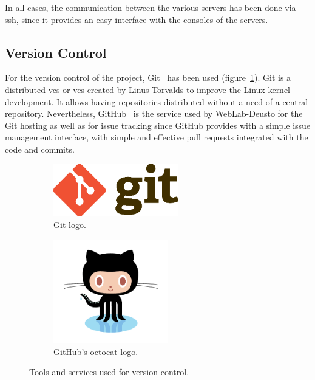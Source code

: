 In all cases, the communication between the various servers has been done via \acrshort{ssh}, since
it provides an easy interface with the consoles of the servers.

\subsection{Version Control}

For the version control of the project, Git~\cite{git_web} has been used (figure~\ref{subfig:git}).
Git is a distributed \acrlong{vcs} or \acrshort{vcs} created by Linus Torvalds to improve the Linux
kernel development. It allows having repositories distributed without a need of a central
repository. Nevertheless, GitHub~\cite{github_web} is the service used by WebLab-Deusto for the Git
hosting as well as for issue tracking since GitHub provides with a simple issue management
interface, with simple and effective pull requests integrated with the code and commits.

\begin{figure}[!htbp]
	\centering
	\begin{subfigure}{0.6\textwidth}
		\centering
		\includegraphics[width=0.6\textwidth]{fig/git.eps}
		\caption{Git logo.}\label{subfig:git}
	\end{subfigure}\quad
	\begin{subfigure}{0.3\textwidth}
		\centering
		\includegraphics[width=0.55\textwidth]{fig/github}
		\caption{GitHub's octocat logo.}\label{subfig:github}
	\end{subfigure}\quad
	\caption{Tools and services used for version control.}
\end{figure}
